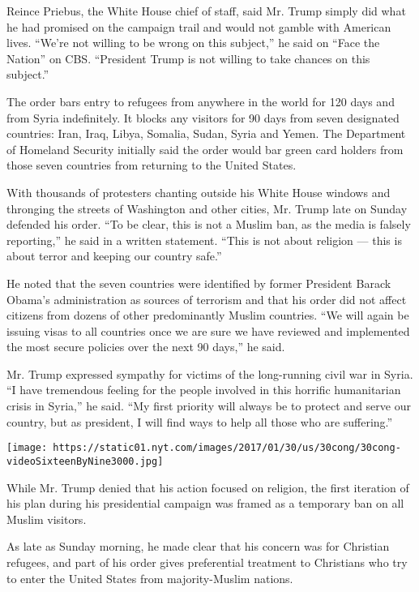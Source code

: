 Reince Priebus, the White House chief of staff, said Mr. Trump simply
did what he had promised on the campaign trail and would not gamble with
American lives. ``We're not willing to be wrong on this subject,'' he
said on ``Face the Nation'' on CBS. ``President Trump is not willing to
take chances on this subject.''

The order bars entry to refugees from anywhere in the world for 120 days
and from Syria indefinitely. It blocks any visitors for 90 days from
seven designated countries: Iran, Iraq, Libya, Somalia, Sudan, Syria and
Yemen. The Department of Homeland Security initially said the order
would bar green card holders from those seven countries from returning
to the United States.

With thousands of protesters chanting outside his White House windows
and thronging the streets of Washington and other cities, Mr. Trump late
on Sunday defended his order. ``To be clear, this is not a Muslim ban,
as the media is falsely reporting,'' he said in a written statement.
``This is not about religion --- this is about terror and keeping our
country safe.''

He noted that the seven countries were identified by former President
Barack Obama's administration as sources of terrorism and that his order
did not affect citizens from dozens of other predominantly Muslim
countries. ``We will again be issuing visas to all countries once we are
sure we have reviewed and implemented the most secure policies over the
next 90 days,'' he said.

Mr. Trump expressed sympathy for victims of the long-running civil war
in Syria. ``I have tremendous feeling for the people involved in this
horrific humanitarian crisis in Syria,'' he said. ``My first priority
will always be to protect and serve our country, but as president, I
will find ways to help all those who are suffering.''

\texttt{[image: https://static01.nyt.com/images/2017/01/30/us/30cong/30cong-videoSixteenByNine3000.jpg]}

While Mr. Trump denied that his action focused on religion, the first
iteration of his plan during his presidential campaign was framed as a
temporary ban on all Muslim visitors.

As late as Sunday morning, he made clear that his concern was for
Christian refugees, and part of his order gives preferential treatment
to Christians who try to enter the United States from majority-Muslim
nations.

